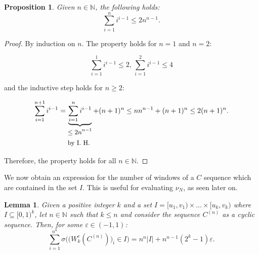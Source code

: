 \documentclass[11pt,a4paper]{tesis}
\theoremstyle{plain}
\newtheorem{lemma}[theorem]{Lemma}
\newtheorem{proposition}[theorem]{Proposition}
\theoremstyle{definition}
\begin{document}
\begin{proposition}\label{proposition:sum-i-to-the-i-m-1}
  Given $n \in \mathbb{N}$, the following holds:
  \begin{equation*}
    \sum_{i = 1}^{n} i^{i - 1} \le 2 n^{n - 1} \text{.}
  \end{equation*}
\end{proposition}

\begin{proof}
  By induction on $n$. The property holds for $n = 1$ and $n = 2$:

  \begin{equation*}
    \sum_{i = 1}^{1} i^{i - 1} \le 2 \text{, } \sum_{i = 1}^{2} i^{i - 1} \le 4
  \end{equation*}

  and the inductive step holds for $n \ge 2$:
  
  
  \begin{equation*}
    \sum_{i = 1}^{n + 1} i^{i - 1} = \underbrace{\sum_{i = 1}^{n} i^{i - 1}}_{
      {
        \begin{aligned}
          & \text{\small $\le 2 n^{n - 1}$} \\
          & \text{\small by I. H.}
        \end{aligned}
      }%
    } + (n + 1)^{n} \le n n^{n - 1} + (n + 1)^{n} \le 2 (n + 1)^{n} \text{.}
  \end{equation*}

  Therefore, the property holds for all $n \in \mathbb{N}$.
\end{proof}

We now obtain an expression for the number of windows of a $C$ sequence which are contained in the set $I$. This is useful for evaluating $\nu_N$, as seen later on.

\begin{lemma}\label{lemma:count-windows-c-sequence-cyclic}
  Given a positive integer $k$ and a set $I = [u_1, v_1) \times \dots \times [u_k, v_k)$ where $I \subseteq [0, 1)^k$, let $n \in \mathbb{N}$ such that $k \le n$ and consider the sequence $C^{(n)}$ as a cyclic sequence. Then, for some $\varepsilon \in (-1, 1)$:
  \begin{equation*}
    \sum_{i = 1}^{n^n} \sigma\Big( \big( W_k^{c}(C^{(n)}) \big)_i \in I \Big) = n^n |I| + n^{n - 1} (2^k - 1) \varepsilon \text{.}
  \end{equation*}
\end{lemma}
\end{document}
